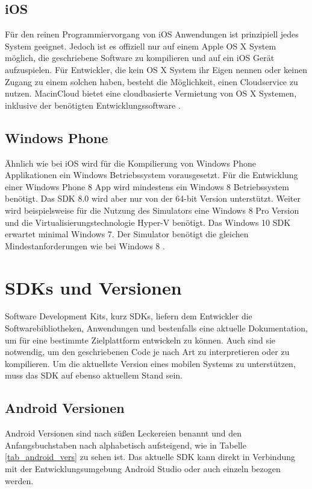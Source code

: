 \subsection{iOS}
Für den reinen Programmiervorgang von iOS Anwendungen ist prinzipiell jedes System geeignet. Jedoch ist es offiziell nur auf einem Apple OS X System möglich, die geschriebene Software zu kompilieren und auf ein iOS Gerät aufzuspielen. Für Entwickler, die kein OS X System ihr Eigen nennen oder keinen Zugang zu einem solchen haben, besteht die Möglichkeit, einen Cloudservice zu nutzen. MacinCloud bietet eine cloudbasierte Vermietung von OS X Systemen, inklusive der benötigten Entwicklungssoftware \citep{macincloud}. 


\subsection{Windows Phone}
Ähnlich wie bei iOS wird für die Kompilierung von Windows Phone Applikationen ein Windows Betriebssystem vorausgesetzt. Für die Entwicklung einer Windows Phone 8 App wird mindestens ein Windows 8 Betriebssystem benötigt. Das SDK 8.0 wird aber nur von der 64-bit Version unterstützt. Weiter wird beispielsweise für die Nutzung des Simulators eine Windows 8 Pro Version und die Virtualisierungstechnologie Hyper-V benötigt. Das Windows 10 SDK erwartet minimal Windows 7. Der Simulator benötigt die gleichen Mindestanforderungen wie bei Windows 8 \citep{WP8_requirements, WP10_SDK, WP10_Emulator}. 


\section{SDKs und Versionen}
Software Development Kits, kurz SDKs, liefern dem Entwickler die Softwarebibliotheken, Anwendungen und bestenfalls eine aktuelle Dokumentation, um für eine bestimmte Zielplattform entwickeln zu können. Auch sind sie notwendig, um den geschriebenen Code je nach Art zu interpretieren oder zu kompilieren. Um die aktuellste Version eines mobilen Systems zu unterstützen, muss das SDK auf ebenso aktuellem Stand sein.

\subsection{Android Versionen}
Android Versionen sind nach süßen Leckereien benannt und den Anfangsbuchstaben nach alphabetisch aufsteigend, wie in Tabelle \ref{tab_android_vers} zu sehen ist.
Das aktuelle SDK kann direkt in Verbindung mit der Entwicklungsumgebung Android Studio oder auch einzeln bezogen werden.

